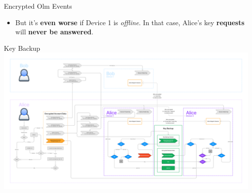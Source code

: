 \documentclass{beeper}
\begin{document}
\begin{frame}{Encrypted Olm Events}
{\begin{itemize}
                This \textbf{works}, but there will likely be a \textbf{lot of
                keys} to request. \textbf{Every user} in \textbf{every encrypted
                room} has diffrent keys.

                This will make \textbf{Device 1} do a \textbf{lot of work} to
                send back all the keys.

                On \textbf{mobile devices}, keysharing \textbf{can't} really be
                done in the \textbf{background}, \textbf{especially} on
                \textbf{iOS}.

                Even on \textbf{desktop} devices, it's still a lot of
                \textbf{work} to \textbf{process} a \textbf{flood} of key
                \textbf{requests}.
            \item But it's \textbf{even worse} if Device 1 is \textit{offline}.
                In that case, Alice's key \textbf{requests} will \textbf{never
                be answered}.
        \end{itemize}
    }
\end{frame}

\begin{frame}{Key Backup}
    \includegraphics[width=\textwidth]{images/other-stuff-key-backup}


\end{frame}
\end{document}
